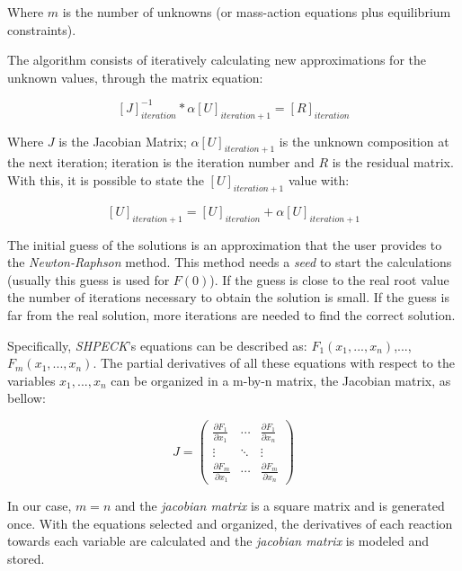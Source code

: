 Where $m$ is the number of unknowns (or mass-action equations plus equilibrium constraints).

The algorithm consists of iteratively calculating new approximations for the unknown values, through the matrix equation:

\begin{equation}
\label{eq:iterativelyAlgorithm}
[J]^{-1}_{iteration}* \alpha [U]_{iteration+1} = [R]_{iteration}
\end{equation}

Where $J$ is the Jacobian Matrix; $ \alpha [U]_{iteration+1} $ is the unknown composition at the next iteration; iteration is the iteration number and $R$ is the residual matrix. With this, it is possible to state the $[U]_{iteration+1}$ value with:

\begin{equation}
\label{eq:CompositionCalculation}
[U]_{iteration+1} = [U]_{iteration} + \alpha [U]_{iteration+1}
\end{equation}


The initial guess of the solutions is an approximation that the user provides to the \emph{Newton-Raphson} method. This method needs a \emph{seed} to start the calculations (usually this guess is used for $F(0)$). 
If the guess is close to the real root value the number of iterations necessary to obtain the solution is small. If the guess is far from the real solution, more iterations are needed to find the correct solution.

Specifically, \emph{SHPECK}'s equations can be described as: $F_1(x_1,..., x_n)$,...,$F_m(x_1,...,x_n)$. The partial derivatives of all these equations with respect to the variables $x_1,...,x_n$ can be organized in a m-by-n matrix, the Jacobian matrix, as bellow:

\begin{equation} 
J =
 \begin{pmatrix}
  \frac{\partial F_1}{\partial x_1} & \cdots & \frac{\partial F_1}{\partial x_n} \\
  \vdots  & \ddots & \vdots  \\
  \frac{\partial F_m}{\partial x_1} & \cdots &   \frac{\partial F_m}{\partial x_n}
 \end{pmatrix}
\end{equation}

In our case, $m = n$ and the \emph{jacobian matrix} is a square matrix and is generated once. With the equations selected and organized, the derivatives of each reaction towards each variable are calculated and the \emph{jacobian matrix} is modeled and stored. 

